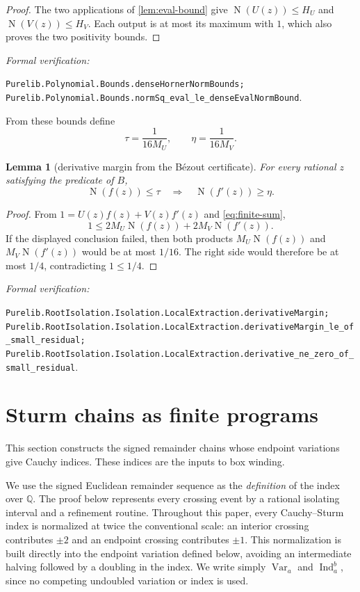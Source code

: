 \documentclass[11pt]{article}
\newtheorem{lemma}[theorem]{Lemma}
\newcommand{\Q}{\mathbb{Q}}
\newcommand{\Norm}[1]{\operatorname{N}\!\left(#1\right)}
\newcommand{\Ind}{\operatorname{Ind}}
\newcommand{\Var}{\operatorname{Var}}
\newcommand{\leanref}[1]{\par\smallskip\noindent
  \emph{Formal verification:}\par\nobreak
  {\raggedright\nolinkurl{#1}.\par}}
\begin{document}
\begin{proof}
The two applications of \cref{lem:eval-bound} give
$\Norm{U(z)}\le H_U$ and $\Norm{V(z)}\le H_V$.  Each output is at most its
maximum with $1$, which also proves the two positivity bounds.
\end{proof}

\leanref{Purelib.Polynomial.Bounds.denseHornerNormBounds;
Purelib.Polynomial.Bounds.normSq_eval_le_denseEvalNormBound}

From these bounds define
\begin{equation}
\label{eq:bez-margins}
       \tau=\frac{1}{16M_U},\qquad \eta=\frac{1}{16M_V}.
\end{equation}

\begin{lemma}[derivative margin from the Bézout certificate]
\label{lem:derivative-margin}
For every rational $z$ satisfying the predicate of $B$,
\[
  \Norm{f(z)}\le\tau \quad\Longrightarrow\quad \Norm{f'(z)}\ge\eta.
\]
\end{lemma}

\begin{proof}
From $1=U(z)f(z)+V(z)f'(z)$ and \eqref{eq:finite-sum},
\[
  1\le 2M_U\Norm{f(z)}+2M_V\Norm{f'(z)}.
\]
If the displayed conclusion failed, then both products
$M_U\Norm{f(z)}$ and $M_V\Norm{f'(z)}$ would be at most $1/16$.
The right side would therefore be at most $1/4$, contradicting $1\le1/4$.
\end{proof}

\leanref{Purelib.RootIsolation.Isolation.LocalExtraction.derivativeMargin;
Purelib.RootIsolation.Isolation.LocalExtraction.derivativeMargin_le_of_small_residual;
Purelib.RootIsolation.Isolation.LocalExtraction.derivative_ne_zero_of_small_residual}

\section{Sturm chains as finite programs}

This section constructs the signed remainder chains whose endpoint
variations give Cauchy indices.  These indices are the inputs to box winding.

We use the signed Euclidean remainder sequence as the \emph{definition} of
the index over $\Q$.  The proof below represents every crossing event by a
rational isolating interval and a refinement routine.  Throughout this paper,
every Cauchy--Sturm index is
normalized at twice the conventional scale: an interior crossing contributes
$\pm2$ and an endpoint crossing contributes $\pm1$.  This normalization is
built directly into the endpoint variation defined below, avoiding an
intermediate halving followed by a doubling in the index.  We write simply
$\Var_a$ and $\Ind_a^b$, since no competing undoubled variation or index is
used.
\end{document}

